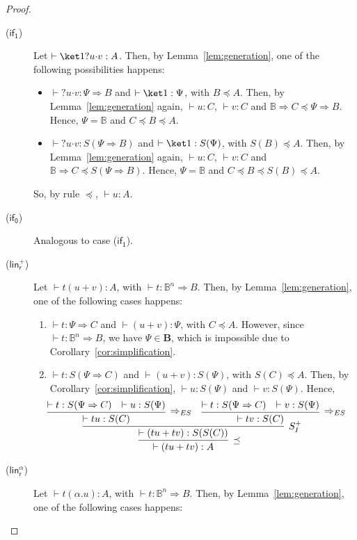 \documentclass[preprint]{elsarticle}
\newcommand\B{\ensuremath{\mathbb B}}
\newcommand\gB{\ensuremath{\Psi}}
\newcommand\ite[3]{{#1}?{#2}\mathord{\cdot}{#3}}
\newcommand\pair[2]{({#1}+{#2})}
\newcommand\bqtypes{\ensuremath{\mathbf B}}
\newcommand\s[1]{\ensuremath{\mathsf{#1}}}
\newcommand\riftrue{(\s{if_{1}})}
\newcommand\riffalse{(\s{if_{0}})}
\newcommand\rlinr{(\s{lin^+_r})}
\newcommand\rlinscalr{(\s{lin^\alpha_r})}
\begin{document}
\begin{proof}
\begin{description}
  \item[\riftrue] Let $\vdash\ite{\ket 1}uv:A$. Then, by
    Lemma~\ref{lem:generation}, one of the following possibilities happens:
    \begin{itemize}
    \item $\vdash\ite{}uv:\Psi\Rightarrow B$ and $\vdash\ket 1:\Psi$, with
      $B\preceq A$.
      Then, by
      Lemma~\ref{lem:generation} again,
      $\vdash u:C$, $\vdash v:C$ and $\B\Rightarrow C\preceq\Psi\Rightarrow
      B$. Hence, $\Psi=\B$ and $C\preceq B\preceq A$.
    \item $\vdash\ite{}uv:S(\Psi\Rightarrow B)$ and $\vdash \ket 1:S(\Psi)$,
      with $S(B)\preceq A$. Then, by Lemma~\ref{lem:generation} again,
      $\vdash u:C$, $\vdash v:C$ and $\B\Rightarrow C\preceq S(\Psi\Rightarrow
      B)$. Hence, $\Psi=\B$ and $C\preceq B\preceq S(B)\preceq A$.
    \end{itemize}
    So, by rule $\preceq$, $\vdash u:A$.
  \item[\riffalse] Analogous to case \riftrue.
  \item[\rlinr] Let $\vdash t\pair uv:A$, with $\vdash t:\B^n\Rightarrow B$. Then,
    by Lemma~\ref{lem:generation}, one of the following cases happens:
    \begin{enumerate}
    \item $\vdash t:\gB\Rightarrow C$ and $\vdash\pair uv:\gB$, with $C\preceq
      A$. However, since $\vdash t:\B^n\Rightarrow B$, we have $\gB\in\bqtypes$,
      which is impossible due to Corollary~\ref{cor:simplification}.
    \item $\vdash t:S(\gB\Rightarrow C)$ and $\vdash\pair uv:S(\gB)$, with
      $S(C)\preceq A$. Then, by Corollary~\ref{cor:simplification}, $\vdash
      u:S(\gB)$ and $\vdash v:S(\gB)$. Hence,
      \[
        \hspace{-5mm}  \infer[\preceq] {\vdash\pair{tu}{tv}:A} { \infer[S_I^+]
          {\vdash\pair{tu}{tv}:S(S(C))} { \infer[\Rightarrow_{ES}] {\vdash
              tu:S(C)} { \vdash t:S(\gB\Rightarrow C) & \vdash u:S(\gB) } &
            \infer[\Rightarrow_{ES}] {\vdash tv:S(C)} { \vdash
              t:S(\gB\Rightarrow C) & \vdash v:S(\gB) } } }
      \]
    \end{enumerate}
  \item[\rlinscalr] Let $\vdash t(\alpha.u):A$, with $\vdash t:\B^n\Rightarrow B$.
    Then, by Lemma~\ref{lem:generation}, one of the following cases happens:
\end{description}
\end{proof}
\end{document}
